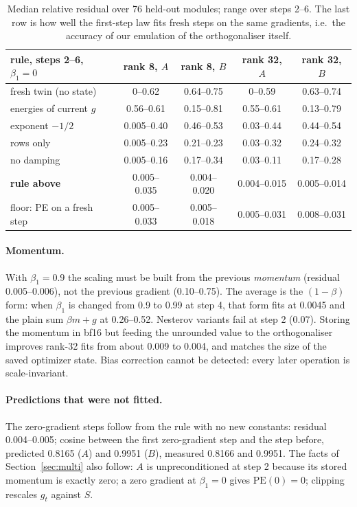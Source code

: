 \documentclass[11pt]{article}
\begin{document}
\begin{table}[h]\centering\small
\begin{tabular}{lcccc}\toprule
rule, steps 2--6, $\beta_1=0$ & rank 8, $A$ & rank 8, $B$ & rank 32, $A$ & rank 32, $B$\\\midrule
fresh twin (no state) & 0--0.62 & 0.64--0.75 & 0--0.59 & 0.63--0.74\\
energies of current $g$ & 0.56--0.61 & 0.15--0.81 & 0.55--0.61 & 0.13--0.79\\
exponent $-1/2$ & 0.005--0.40 & 0.46--0.53 & 0.03--0.44 & 0.44--0.54\\
rows only & 0.005--0.23 & 0.21--0.23 & 0.03--0.32 & 0.24--0.32\\
no damping & 0.005--0.16 & 0.17--0.34 & 0.03--0.11 & 0.17--0.28\\
\textbf{rule above} & 0.005--0.035 & 0.004--0.020 & 0.004--0.015 & 0.005--0.014\\
floor: PE on a fresh step & 0.005--0.033 & 0.005--0.018 & 0.005--0.031 & 0.008--0.031\\\bottomrule
\end{tabular}
\caption{Median relative residual over 76 held-out modules; range over steps 2--6. The last row
is how well the first-step law fits fresh steps on the same gradients, i.e.\ the accuracy of our
emulation of the orthogonaliser itself.}
\end{table}

\paragraph{Momentum.} With $\beta_1=0.9$ the scaling must be built from the previous
\emph{momentum} (residual 0.005--0.006), not the previous gradient (0.10--0.75). The average is
the $(1-\beta)$ form: when $\beta_1$ is changed from 0.9 to 0.99 at step 4, that form fits at
0.0045 and the plain sum $\beta m+g$ at 0.26--0.52. Nesterov variants fail at step 2 (0.07).
Storing the momentum in bf16 but feeding the unrounded value to the orthogonaliser improves
rank-32 fits from about 0.009 to 0.004, and matches the size of the saved optimizer state.
Bias correction cannot be detected: every later operation is scale-invariant.

\paragraph{Predictions that were not fitted.} The zero-gradient steps follow from the rule with
no new constants: residual 0.004--0.005; cosine between the first zero-gradient step and the
step before, predicted 0.8165 ($A$) and 0.9951 ($B$), measured 0.8166 and 0.9951. The facts of
Section~\ref{sec:multi} also follow: $A$ is unpreconditioned at step 2 because its stored
momentum is exactly zero; a zero gradient at $\beta_1=0$ gives $\mathrm{PE}(0)=0$; clipping
rescales $g_t$ against $S$.
\end{document}
